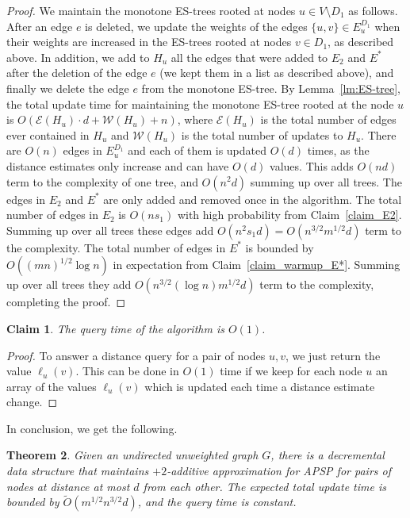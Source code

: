 \documentclass[11pt]{article}
\newtheorem{theorem}{Theorem}[section]
\newtheorem{claim}[theorem]{Claim}
\theoremstyle{definition}
\theoremstyle{remark}
\newcommand{\ttodo}[1]{\todo[color=orange!20]{T: #1}}
\begin{document}
\begin{proof}
We maintain the monotone ES-trees rooted at nodes $u \in V \setminus D_1$ as follows. After an edge $e$ is deleted, we update the weights of the edges $\{u,v\} \in E_u^{D_1}$ when their weights are increased in the ES-trees rooted at nodes $v \in D_1$, as described above. In addition, we add to $H_u$ all the edges that were added to $E_2$ and $E^*$ after the deletion of the edge $e$ (we kept them in a list as described above), and finally we delete the edge $e$ from the monotone ES-tree. By Lemma~\ref{lm:ES-tree}, the total update time for maintaining the monotone ES-tree rooted at the node $u$ is 
$O(\mathcal E(H_u)\cdot d+\mathcal W(H_u)+n)$, where $\mathcal E(H_u)$ is the total number of edges ever contained in $H_u$ and $\mathcal W(H_u)$ is the total number of updates to $H_u$. There are $O(n)$ edges in $E_u^{D_1}$ and each of them is updated $O(d)$ times, as the distance estimates only increase and can have $O(d)$ values. This adds $O(nd)$ term to the complexity of one tree, and $O(n^2 d)$ summing up over all trees. The edges in $E_2$ and $E^*$ are only added and removed once in the algorithm. The total number of edges in $E_2$ is $O(ns_1)$ with high probability from Claim~\ref{claim_E2}. Summing up over all trees these edges add $O(n^2 s_1 d)= O(n^{3/2} m^{1/2} d)$ term to the complexity. The total number of edges in $E^*$ is bounded by $O( (mn)^{1/2}\log{n} )$ in expectation from Claim~\ref{claim_warmup_E*}. Summing up over all trees they add $O(n^{3/2} (\log{n}) m^{1/2} d)$ term to the complexity, completing the proof.
\end{proof} 

\begin{claim}
The query time of the algorithm is $O(1)$.
\end{claim}

\begin{proof}
To answer a distance query for a pair of nodes $u,v$, we just return the value $\ell_u(v)$. This can be done in $O(1)$ time if we keep for each node $u$ an array of the values $\ell_u(v)$ which is updated each time a distance estimate change.
\end{proof}

In conclusion, we get the following.

\begin{theorem}
Given an undirected unweighted graph $G$, there is a decremental data structure that maintains $+2$-additive approximation for APSP for pairs of nodes at distance at most $d$ from each other. The expected total update time is bounded by $\tilde{O}(m^{1/2}n^{3/2}d)$, and the query time is constant.
\end{theorem}%
\end{document}
